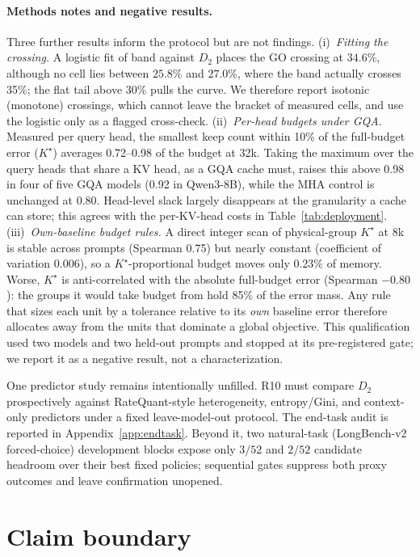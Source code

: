 \paragraph{Methods notes and negative results.}
Three further results inform the protocol but are not findings.
(i)~\emph{Fitting the crossing.}  A logistic fit of band against $D_2$ places the
GO crossing at $34.6\%$, although no cell lies between $25.8\%$ and $27.0\%$,
where the band actually crosses 35\%; the flat tail above 30\% pulls the curve.
We therefore report isotonic (monotone) crossings, which cannot leave the
bracket of measured cells, and use the logistic only as a flagged cross-check.
(ii)~\emph{Per-head budgets under GQA.}  Measured per query head, the smallest
keep count within 10\% of the full-budget error ($K^\star$) averages 0.72--0.98
of the budget at 32k.  Taking the maximum over the query heads that share a KV
head, as a GQA cache must, raises this above 0.98 in four of five GQA models
(0.92 in Qwen3-8B), while the MHA control is unchanged at 0.80.  Head-level slack
largely disappears at the granularity a cache can store; this agrees with the
per-KV-head costs in Table~\ref{tab:deployment}.
(iii)~\emph{Own-baseline budget rules.}  A direct integer scan of physical-group
$K^\star$ at 8k is stable across prompts (Spearman 0.75) but nearly constant
(coefficient of variation 0.006), so a $K^\star$-proportional budget moves only
0.23\% of memory.  Worse, $K^\star$ is anti-correlated with the absolute
full-budget error (Spearman $-0.80$): the groups it would take budget from hold
85\% of the error mass.  Any rule that sizes each unit by a tolerance relative
to its \emph{own} baseline error therefore allocates away from the units that
dominate a global objective.  This qualification used two models and two
held-out prompts and stopped at its pre-registered gate; we report it as a
negative result, not a characterization.

One predictor study remains intentionally unfilled.  R10 must compare $D_2$
prospectively against RateQuant-style heterogeneity, entropy/Gini, and
context-only predictors under a fixed leave-model-out protocol.  The end-task
audit is reported in Appendix~\ref{app:endtask}.  Beyond it, two natural-task
(LongBench-v2~\citep{bai2025longbenchv2} forced-choice) development blocks expose only $3/52$ and $2/52$
candidate headroom over their best fixed policies; sequential gates suppress
both proxy outcomes and leave confirmation unopened.

\section{Claim boundary}
\label{app:claims}

